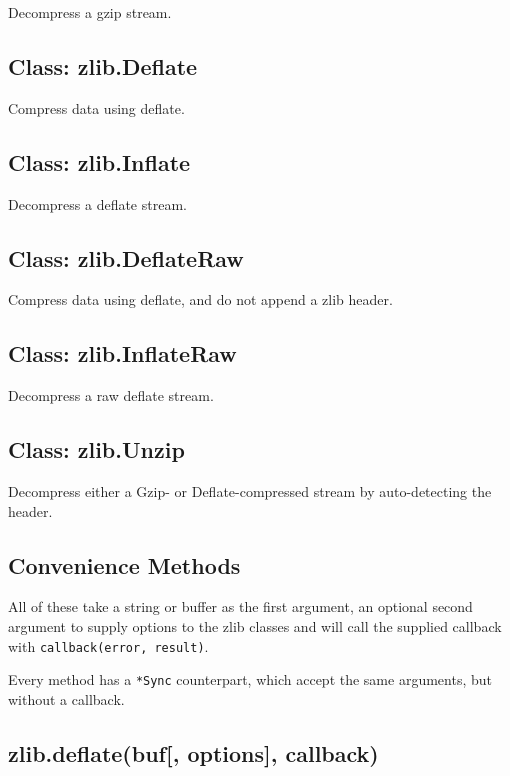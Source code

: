Decompress a gzip stream.

\subsection{Class: zlib.Deflate}\label{class-zlib.deflate}

Compress data using deflate.

\subsection{Class: zlib.Inflate}\label{class-zlib.inflate}

Decompress a deflate stream.

\subsection{Class: zlib.DeflateRaw}\label{class-zlib.deflateraw}

Compress data using deflate, and do not append a zlib header.

\subsection{Class: zlib.InflateRaw}\label{class-zlib.inflateraw}

Decompress a raw deflate stream.

\subsection{Class: zlib.Unzip}\label{class-zlib.unzip}

Decompress either a Gzip- or Deflate-compressed stream by auto-detecting
the header.

\subsection{Convenience Methods}\label{convenience-methods}

All of these take a string or buffer as the first argument, an optional
second argument to supply options to the zlib classes and will call the
supplied callback with \texttt{callback(error,\ result)}.

Every method has a \texttt{*Sync} counterpart, which accept the same
arguments, but without a callback.

\subsection{zlib.deflate(buf{[}, options{]},
callback)}\label{zlib.deflatebuf-options-callback}

